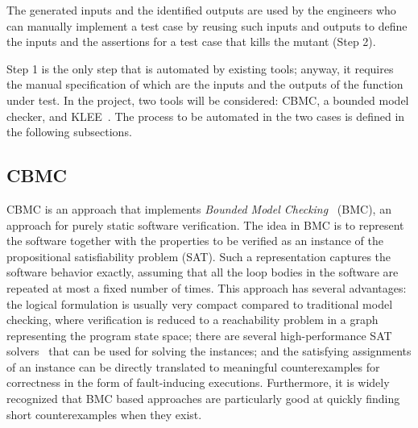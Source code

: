  The generated inputs and the identified outputs are used by the engineers who can manually implement a test case by reusing such inputs and outputs to define the inputs and the assertions for a test case that kills the mutant (Step 2). 
 


Step 1 is the only step that is automated by existing tools; anyway, it requires the manual specification of which are the inputs and the outputs of the function under test. In the project, two tools will be considered: CBMC, a bounded model checker, and KLEE~\cite{cadar2008klee}. The process to be automated in the two cases is defined in the following subsections.

\subsection{CBMC}
\label{subsec:cbmc}

CBMC is an approach that implements {\em Bounded Model
Checking}~\cite{BiereCCZ:TACAS99,SeryFS:ATVA12} (BMC), an approach for purely static software verification.
The idea in BMC is to represent the software together with the
properties to be verified as an instance of the propositional
satisfiability problem (SAT).  Such a representation captures the
software behavior exactly, assuming that all the loop bodies in the
software are repeated at most a fixed number of times.
%
This approach has several advantages: the logical formulation is usually
very compact compared to traditional model checking, where verification
is reduced to a reachability problem in a graph representing the program
state space;
%
there are several high-performance SAT
solvers~\cite{MarquesSilva:IEEETRAN99,EenS:SAT2003} that can be used for
solving the instances;
%
and the satisfying assignments of an instance can be directly translated
to meaningful counterexamples for correctness in the form of
fault-inducing executions.
%
Furthermore, it is widely recognized that BMC based approaches are particularly good
at quickly finding short counterexamples when they exist.

